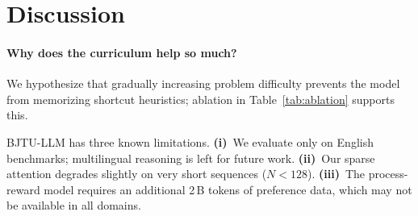\section{Discussion}
\label{sec:discussion}

\paragraph{Why does the curriculum help so much?} We hypothesize that
gradually increasing problem difficulty prevents the model from memorizing
shortcut heuristics; ablation in Table~\ref{tab:ablation} supports this.

\begin{limitations}
BJTU-LLM has three known limitations. \textbf{(i)}~We evaluate only on
English benchmarks; multilingual reasoning is left for future work.
\textbf{(ii)}~Our sparse attention degrades slightly on very short sequences
($N<128$). \textbf{(iii)}~The process-reward model requires an additional
2\,B tokens of preference data, which may not be available in all domains.
\end{limitations}
